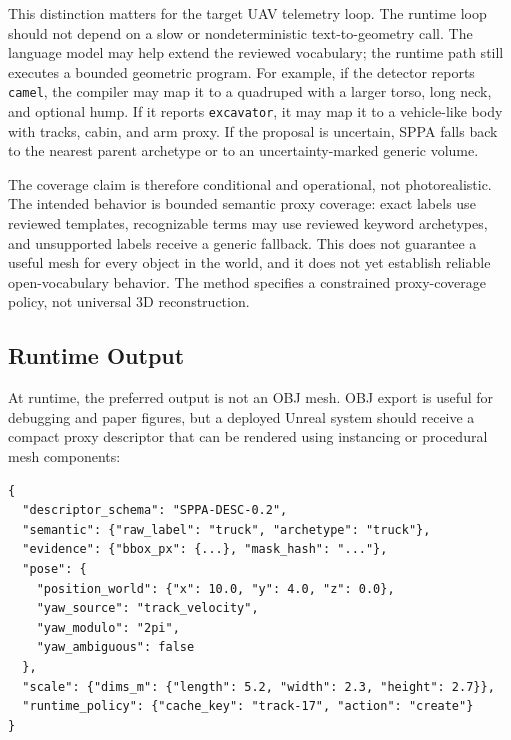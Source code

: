 ﻿\documentclass[11pt,a4paper]{article}
\begin{document}
This distinction matters for the target UAV telemetry loop. The runtime loop should
not depend on a slow or nondeterministic text-to-geometry call. The language
model may help extend the reviewed vocabulary; the runtime path still executes
a bounded geometric program. For example, if the detector reports
\texttt{camel}, the compiler may map it to a quadruped with a larger torso, long
neck, and optional hump. If it reports \texttt{excavator}, it may map it to a
vehicle-like body with tracks, cabin, and arm proxy. If the proposal is
uncertain, SPPA falls back to the nearest parent archetype or to an
uncertainty-marked generic volume.

The coverage claim is therefore conditional and operational, not
photorealistic. The intended behavior is bounded semantic proxy coverage: exact
labels use reviewed templates, recognizable terms may use reviewed keyword
archetypes, and unsupported labels receive a generic fallback. This does not
guarantee a useful mesh for every object in the world, and it does not yet
establish reliable open-vocabulary behavior. The method specifies a constrained
proxy-coverage policy, not universal 3D reconstruction.

\subsection{Runtime Output}

At runtime, the preferred output is not an OBJ mesh. OBJ export is useful for
debugging and paper figures, but a deployed Unreal system should receive a
compact proxy descriptor that can be rendered using instancing or procedural
mesh components:

\begin{verbatim}
{
  "descriptor_schema": "SPPA-DESC-0.2",
  "semantic": {"raw_label": "truck", "archetype": "truck"},
  "evidence": {"bbox_px": {...}, "mask_hash": "..."},
  "pose": {
    "position_world": {"x": 10.0, "y": 4.0, "z": 0.0},
    "yaw_source": "track_velocity",
    "yaw_modulo": "2pi",
    "yaw_ambiguous": false
  },
  "scale": {"dims_m": {"length": 5.2, "width": 2.3, "height": 2.7}},
  "runtime_policy": {"cache_key": "track-17", "action": "create"}
}
\end{verbatim}
\end{document}

